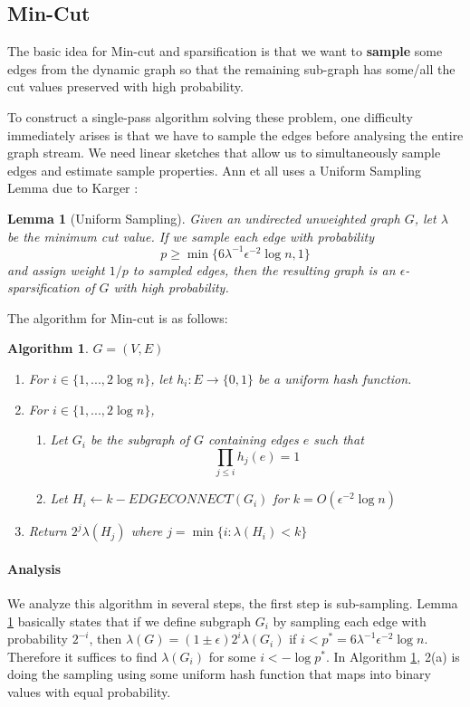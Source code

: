 \documentclass[11pt]{article}
\theoremstyle{plain}
\newtheorem{algorithm}{Algorithm}[section]
\newtheorem{lemma}[theorem]{Lemma}
\begin{document}
\subsection{Min-Cut}
The basic idea for Min-cut and sparsification is that we want to 
\textbf{sample} some 
edges from the dynamic graph so that the remaining sub-graph has some/all 
the cut values preserved with high probability. 

To construct a single-pass algorithm solving these problem, one difficulty 
immediately arises is that we have to sample the edges before analysing the 
entire graph stream. We need linear sketches that allow us to simultaneously 
sample edges and estimate sample properties. Ann et all uses a Uniform 
Sampling Lemma due to Karger \cite{Karger94}: 

\begin{lemma}[Uniform Sampling]
\label{le:uniform-sampling}
Given an undirected unweighted graph $G$, let $\lambda$ be the minimum 
cut value. If we sample each edge with probability
\[
p\geq \min\{6\lambda^{-1}\epsilon^{-2}\log n,1\}
\]
and assign weight $1/p$ to sampled edges, then the resulting graph
is an $\epsilon$-sparsification of $G$ with high probability.
\end{lemma}

The algorithm for Min-cut is as follows:

\begin{algorithm}
	\label{al:min-cut}
$G=(V, E)$
\begin{enumerate}
	\item For $i \in \{1, . . . , 2 \log n\}$, let $h_i : E\rightarrow \{0, 1\}$ be a 
	uniform hash function.
	\item For $i \in \{1, . . . , 2 \log n\}$,\begin{enumerate}
		\item Let $G_i$ be the subgraph of $G$ containing edges $e$ such that 
		 \[
		 \prod_{j\leq i}h_j(e)=1
		 \]
		\item Let $H_i\leftarrow k-EDGECONNECT(G_i)$ for 
		$k=O(\epsilon^{-2}\log n)$
	\end{enumerate}
	\item Return $2^j \lambda(H_j)$ where $j = \min\{i : \lambda(H_i) < k\}$
\end{enumerate}
\end{algorithm}

\paragraph{Analysis}
We analyze this algorithm in several steps, the first step is sub-sampling. 
Lemma \ref{le:uniform-sampling} basically states that if we define subgraph 
$G_i$ by sampling each edge with probability $2^{-i}$, then 
$\lambda(G)=(1\pm \epsilon)2^i\lambda(G_i)$ if 
$i<p^{*}=6\lambda^{-1}\epsilon^{-2}\log n$. Therefore it suffices to find 
$\lambda(G_i)$ for some $i<-\log p^*$. In Algorithm \ref{al:min-cut}, 2(a) is 
doing the sampling using some uniform hash function that maps into binary 
values with equal probability. 
\end{document}
